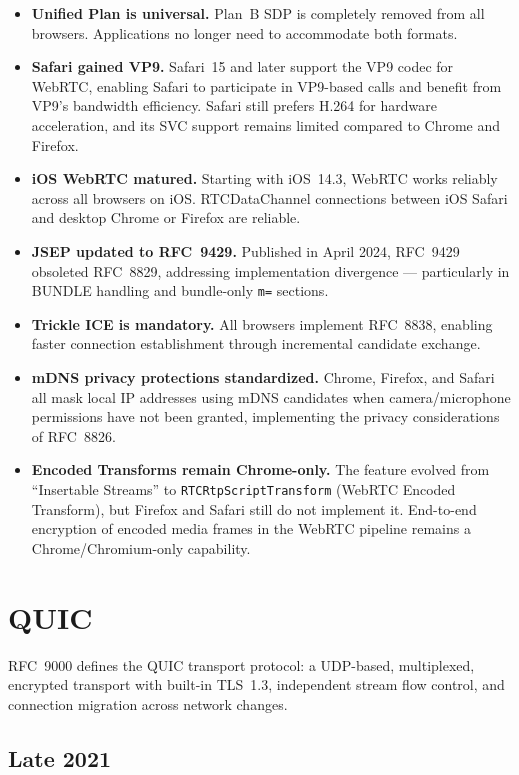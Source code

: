 \documentclass[11pt]{article}
\begin{document}
\begin{itemize}
  \item \textbf{Unified Plan is universal.} Plan~B SDP is completely removed
    from all browsers. Applications no longer need to accommodate both formats.
  \item \textbf{Safari gained VP9.} Safari~15 and later support the VP9 codec
    for WebRTC, enabling Safari to participate in VP9-based calls and benefit
    from VP9's bandwidth efficiency. Safari still prefers H.264 for hardware
    acceleration, and its SVC support remains limited compared to
    Chrome and Firefox.
  \item \textbf{iOS WebRTC matured.} Starting with iOS~14.3, WebRTC works
    reliably across all browsers on iOS. RTCDataChannel connections between
    iOS Safari and desktop Chrome or Firefox are reliable.
  \item \textbf{JSEP updated to RFC~9429.} Published in April 2024, RFC~9429
    obsoleted RFC~8829, addressing implementation divergence --- particularly
    in BUNDLE handling and bundle-only \texttt{m=} sections.
  \item \textbf{Trickle ICE is mandatory.} All browsers implement RFC~8838,
    enabling faster connection establishment through incremental candidate
    exchange.
  \item \textbf{mDNS privacy protections standardized.} Chrome, Firefox, and
    Safari all mask local IP addresses using mDNS candidates when
    camera/microphone permissions have not been granted, implementing the
    privacy considerations of RFC~8826.
  \item \textbf{Encoded Transforms remain Chrome-only.} The feature
    evolved from ``Insertable Streams'' to \texttt{RTCRtp\-Script\-Transform}
    (WebRTC Encoded Transform), but Firefox and Safari still do not
    implement it. End-to-end encryption of encoded media frames in the
    WebRTC pipeline remains a Chrome/Chromium-only capability.
\end{itemize}

\section{QUIC}

RFC~9000 defines the QUIC transport protocol: a UDP-based, multiplexed,
encrypted transport with built-in TLS~1.3, independent stream flow control,
and connection migration across network changes.

\subsection{Late 2021}
\end{document}
